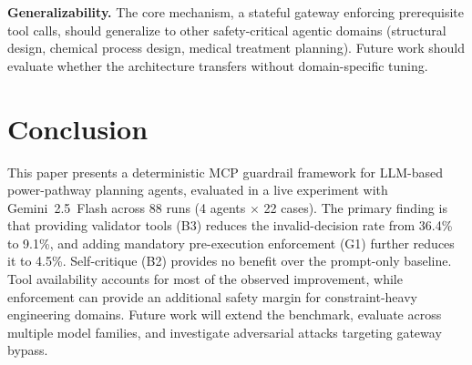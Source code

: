 \documentclass[conference]{IEEEtran}
\begin{document}
\textbf{Generalizability.}  The core mechanism, a stateful gateway enforcing
prerequisite tool calls, should generalize to other safety-critical agentic
domains (structural design, chemical process design, medical treatment
planning).  Future work should evaluate whether the architecture transfers
without domain-specific tuning.

\section{Conclusion}

This paper presents a deterministic MCP guardrail framework for LLM-based
power-pathway planning agents, evaluated in a live experiment with
Gemini~2.5~Flash across 88 runs (4 agents $\times$ 22 cases).  The
primary finding is that providing validator tools (B3) reduces the
invalid-decision rate from 36.4\% to 9.1\%, and adding mandatory
pre-execution enforcement (G1) further reduces it to 4.5\%.
Self-critique (B2) provides no benefit over the prompt-only baseline.
Tool availability accounts for most of the observed improvement, while
enforcement can provide an additional safety margin for constraint-heavy
engineering domains.  Future work will extend the benchmark, evaluate
across multiple model families, and investigate adversarial attacks
targeting gateway bypass.



\end{document}
